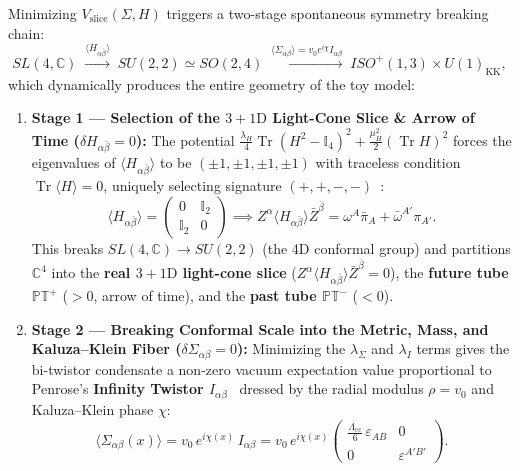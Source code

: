 \documentclass[11pt,a4paper]{article}
\begin{document}
Minimizing $V_{\text{slice}}(\Sigma, H)$ triggers a two-stage spontaneous symmetry breaking chain:
\begin{equation}
SL(4,\mathbb{C}) \;\xrightarrow{\langle H_{\alpha\bar{\beta}} \rangle}\; SU(2,2) \simeq SO(2,4) \;\xrightarrow{\langle \Sigma_{\alpha\beta} \rangle = v_0 e^{i\chi} I_{\alpha\beta}}\; ISO^+(1,3) \times U(1)_{\text{KK}},
\end{equation}
which dynamically produces the entire geometry of the toy model:
\begin{enumerate}
    \item \textbf{Stage 1 --- Selection of the $3+1\text{D}$ Light-Cone Slice \& Arrow of Time ($\delta H_{\alpha\bar{\beta}} = 0$):}
    The potential $\frac{\lambda_H}{4}\operatorname{Tr}(H^2 - \mathbb{I}_4)^2 + \frac{\mu_H^2}{2}(\operatorname{Tr}H)^2$ forces the eigenvalues of $\langle H_{\alpha\bar{\beta}} \rangle$ to be $(\pm 1, \pm 1, \pm 1, \pm 1)$ with traceless condition $\operatorname{Tr}\langle H \rangle = 0$, uniquely selecting signature $(+,+,-,-)$~\cite{Penrose1967}:
    \begin{equation}
    \langle H_{\alpha\bar{\beta}} \rangle = \begin{pmatrix} 0 & \mathbb{I}_2 \\ \mathbb{I}_2 & 0 \end{pmatrix} \implies Z^\alpha \langle H_{\alpha\bar{\beta}} \rangle \bar{Z}^{\bar{\beta}} = \omega^A \bar{\pi}_A + \bar{\omega}^{A'}\pi_{A'}.
    \end{equation}
    This breaks $SL(4,\mathbb{C}) \to SU(2,2)$ (the 4D conformal group) and partitions $\mathbb{C}^4$ into the \textbf{real $3+1\text{D}$ light-cone slice} ($Z^\alpha \langle H_{\alpha\bar{\beta}}\rangle \bar{Z}^{\bar{\beta}} = 0$), the \textbf{future tube $\mathbb{PT}^+$} ($>0$, arrow of time), and the \textbf{past tube $\mathbb{PT}^-$} ($<0$).
    \item \textbf{Stage 2 --- Breaking Conformal Scale into the Metric, Mass, and Kaluza--Klein Fiber ($\delta \Sigma_{\alpha\beta} = 0$):}
    Minimizing the $\lambda_\Sigma$ and $\lambda_I$ terms gives the bi-twistor condensate a non-zero vacuum expectation value proportional to Penrose's \textbf{Infinity Twistor $I_{\alpha\beta}$}~\cite{PenroseRindler1984} dressed by the radial modulus $\rho = v_0$ and Kaluza--Klein phase $\chi$:
    \begin{equation}
    \langle \Sigma_{\alpha\beta}(x) \rangle = v_0\, e^{i\chi(x)}\, I_{\alpha\beta} = v_0\, e^{i\chi(x)} \begin{pmatrix} \frac{\Lambda_{\text{cc}}}{6}\,\varepsilon_{AB} & 0 \\ 0 & \varepsilon^{A'B'} \end{pmatrix}.

\end{equation}
\end{enumerate}
\end{document}
